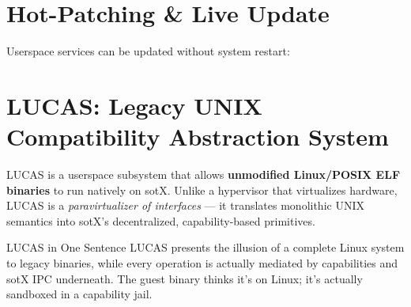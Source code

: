 \documentclass[11pt,a4paper]{article}
\begin{document}
\section{Hot-Patching \& Live Update}

Userspace services can be updated without system restart:

\begin{center}
\end{center}

\section{LUCAS: Legacy UNIX Compatibility Abstraction System}

LUCAS is a userspace subsystem that allows \textbf{unmodified Linux/POSIX ELF binaries}
to run natively on sotX. Unlike a hypervisor that virtualizes hardware,
LUCAS is a \textit{paravirtualizer of interfaces} --- it translates monolithic
UNIX semantics into sotX's decentralized, capability-based primitives.

\begin{principalbox}{LUCAS in One Sentence}
LUCAS presents the illusion of a complete Linux system to legacy binaries,
while every operation is actually mediated by capabilities and sotX IPC
underneath. The guest binary thinks it's on Linux; it's actually sandboxed
in a capability jail.
\end{principalbox}
\end{document}
